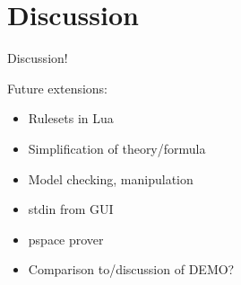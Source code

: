 \section{Discussion}

Discussion!

Future extensions:
\begin{itemize}
\item Rulesets in Lua
\item Simplification of theory/formula
\item Model checking, manipulation
\item stdin from GUI
\item {\sc pspace} prover
\item Comparison to/discussion of DEMO?
\end{itemize}
